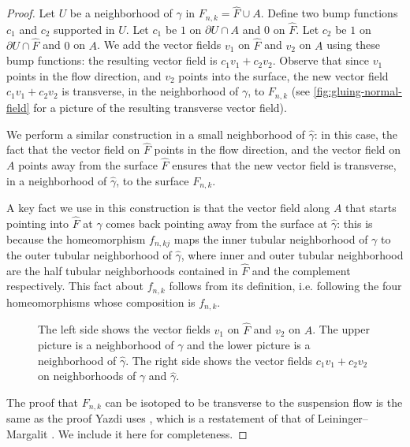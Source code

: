 \begin{proof}
Let $U$ be a neighborhood of $\gamma$ in $F_{n,k}=\widehat{F}\cup A$. Define two bump functions $c_1$ and $c_2$ supported in $U$.  Let $c_1$ be $1$ on $\partial U\cap A$ and $0$ on $\widehat{F}$. Let $c_2$ be $1$ on $\partial U\cap \widehat{F}$ and $0$ on $A$.
  We add the vector fields $v_1$ on $\widehat{F}$ and $v_2$ on $A$ using these bump functions: the resulting vector field is $c_1 v_1 + c_2 v_2$.
  Observe that since $v_1$ points in the flow direction, and $v_2$ points into the surface, the new vector field $c_1 v_1 + c_2 v_2$ is transverse, in the neighborhood of $\gamma$, to $F_{n,k}$ (see \autoref{fig:gluing-normal-field} for a picture of the resulting transverse vector field).

  We perform a similar construction in a small neighborhood of $\widehat{\gamma}$: in this case, the fact that the vector field on $\widehat{F}$ points in the flow direction, and the vector field on $A$ points away from the surface $\widehat{F}$ ensures that the new vector field is transverse, in a neighborhood of $\widehat{\gamma}$, to the surface $F_{n,k}$.

  A key fact we use in this construction is that the vector field along $A$ that starts pointing into $\widehat{F}$ at $\gamma$ comes back pointing away from the surface at $\widehat{\gamma}$: this is because the homeomorphism $f_{n,kj}$ maps the inner tubular neighborhood of $\gamma$ to the outer tubular neighborhood of $\widehat{\gamma}$, where inner and outer tubular neighborhood are the half tubular neighborhoods contained in $\widehat{F}$ and the complement respectively.
  This fact about $f_{n,k}$ follows from its definition, i.e. following the four homeomorphisms whose composition is $f_{n,k}$.
\begin{figure}[t]
  \centering
  \caption{The left side shows the vector fields $v_1$ on $\widehat{F}$ and $v_2$ on $A$.  The upper picture is a neighborhood of $\gamma$ and the lower picture is a neighborhood of $\widehat{\gamma}$.  The right side shows the vector fields $c_1v_1+c_2v_2$ on neighborhoods of $\gamma$ and $\widehat{\gamma}$.}
  \label{fig:gluing-normal-field}
\end{figure}


  The proof that $F_{n,k}$ can be isotoped to be transverse to the suspension flow is the same as the
  proof Yazdi uses \cite{yazdi2018pseudo}, which is a restatement of that of Leininger--Margalit \cite{leininger2013number}. We include it here for completeness.


\end{proof}

